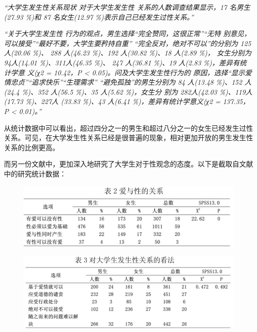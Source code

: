 \documentclass[UTF8,a4paper]{ctexart}
\begin{document}
\textit{
“大学生发生性关系现状 对于大学生发生性
关系的人数调查结果显示，17 名男生(27.93 \%)和 87 名女生(12.97 \%)表示自己已经发生过性关系。”}

\textit{
“关于大学生发生性 行为的观点，男生选择“完全赞同，这很正常”“无特 别意见，可以接受”“最好不要，大学生要矜持自重” “完全反对，绝对不可以”的分别为 125 人(20.06 \%)、 288 人(46.23 \%)、192 人(30.82 \%)、18 人(2.89 \%)， 女生分别为 94人(14.01 \%)、311人(46.35 \%)、 247 人(36.81 \%)、19 人(2.83 \%)，差异有统计学意 义(χ2 = 10.42，P < 0.05)。问及大学生发生性行为的 原因，选择“显示爱情忠贞”“追求快乐”“生理需求” “避免孤独”的男生分别为 84 人(13.48 \%)、152 人 (24.4 \%)、352 人(56.5 \%)、35 人(5.62 \%)，女生分 别为 282人(42.03 \%)、119人(17.73 \%)、227人 (33.83 \%)、43 人(6.41 \%)，差异有统计学意义(χ2 = 137.35，P < 0.01)。”}

从统计数据中可以看出，超过四分之一的男生和超过八分之一的女生已经发生过性关系。可见，在大学发生性关系已经是很普遍的现象，相对更加开放的男生发生性关系的比例更高。

而另一份文献中，更加深入地研究了大学生对于性观念的态度。以下是截取自文献中的研究统计数据：

\begin{figure}[ht]
    \centering
    \includegraphics[scale=0.4]{2.jpg}
    \end{figure}
    
\begin{figure}[ht]
    \centering
    \includegraphics[scale=0.4]{3.jpg}
    \end{figure}
\end{document}
